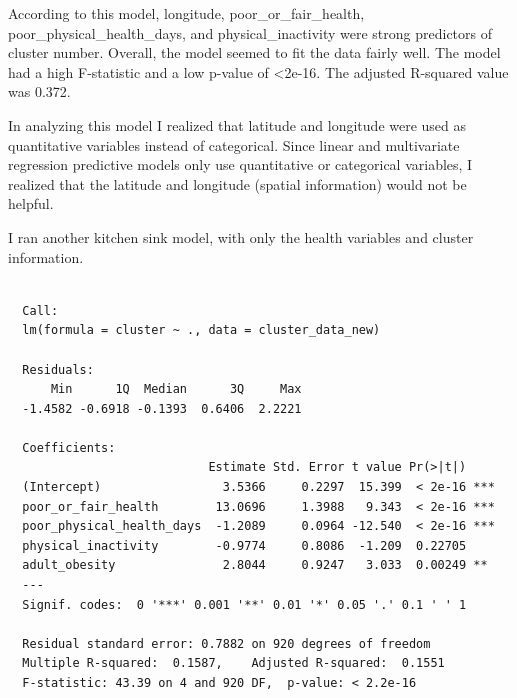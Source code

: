 \documentclass[12pt,twoside]{amherstthesis}
\begin{document}
  According to this model, longitude, poor\_or\_fair\_health,
  poor\_physical\_health\_days, and physical\_inactivity were strong
  predictors of cluster number. Overall, the model seemed to fit the data
  fairly well. The model had a high F-statistic and a low p-value of
  \textless{}2e-16. The adjusted R-squared value was 0.372.
  
  In analyzing this model I realized that latitude and longitude were used
  as quantitative variables instead of categorical. Since linear and
  multivariate regression predictive models only use quantitative or
  categorical variables, I realized that the latitude and longitude
  (spatial information) would not be helpful.
  
  \begin{Shaded}
  \end{Shaded}
  
  I ran another kitchen sink model, with only the health variables and
  cluster information.
  
  \begin{Shaded}
  \begin{Highlighting}[]
  \StringTok{ }\OperatorTok{~}
  \end{Highlighting}
  \end{Shaded}
  
  \begin{verbatim}
  
  Call:
  lm(formula = cluster ~ ., data = cluster_data_new)
  
  Residuals:
      Min      1Q  Median      3Q     Max 
  -1.4582 -0.6918 -0.1393  0.6406  2.2221 
  
  Coefficients:
                            Estimate Std. Error t value Pr(>|t|)    
  (Intercept)                 3.5366     0.2297  15.399  < 2e-16 ***
  poor_or_fair_health        13.0696     1.3988   9.343  < 2e-16 ***
  poor_physical_health_days  -1.2089     0.0964 -12.540  < 2e-16 ***
  physical_inactivity        -0.9774     0.8086  -1.209  0.22705    
  adult_obesity               2.8044     0.9247   3.033  0.00249 ** 
  ---
  Signif. codes:  0 '***' 0.001 '**' 0.01 '*' 0.05 '.' 0.1 ' ' 1
  
  Residual standard error: 0.7882 on 920 degrees of freedom
  Multiple R-squared:  0.1587,    Adjusted R-squared:  0.1551 
  F-statistic: 43.39 on 4 and 920 DF,  p-value: < 2.2e-16
  \end{verbatim}
  
\end{document}
